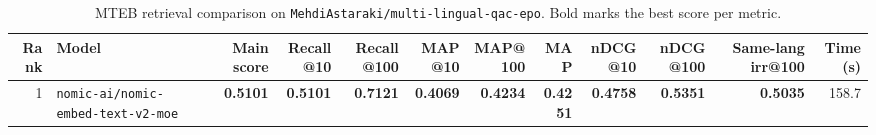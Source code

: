 \begin{table}[t]
\centering
\small
\begin{tabular}{r l r r r r r r r r r r}
\hline
Rank & Model & Main score & Recall@10 & Recall@100 & MAP@10 & MAP@100 & MAP & nDCG@10 & nDCG@100 & Same-lang irr@100 & Time (s) \\
\hline
1 & \texttt{nomic-ai/nomic-embed-text-v2-moe} & \textbf{0.5101} & \textbf{0.5101} & \textbf{0.7121} & \textbf{0.4069} & \textbf{0.4234} & \textbf{0.4251} & \textbf{0.4758} & \textbf{0.5351} & \textbf{0.5035} & 158.7 \\
\hline
\end{tabular}
\caption{MTEB retrieval comparison on \texttt{MehdiAstaraki/multi-lingual-qac-epo}. Bold marks the best score per metric.}
\label{tab:mteb-model-comparison}
\end{table}
